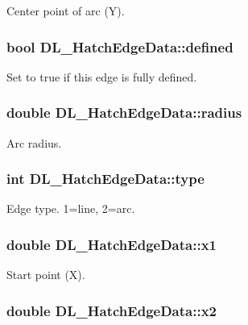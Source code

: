 Center point of arc (Y). \hypertarget{structDL__HatchEdgeData_aea9a928129f785b8f588e448622128a8}{
\subsubsection[{defined}]{\setlength{\rightskip}{0pt plus 5cm}bool D\-L\-\_\-\-Hatch\-Edge\-Data\-::defined}}\label{structDL__HatchEdgeData_aea9a928129f785b8f588e448622128a8}
Set to true if this edge is fully defined. \hypertarget{structDL__HatchEdgeData_acdec94f7b83716a78ccbecc68bea3370}{
\subsubsection[{radius}]{\setlength{\rightskip}{0pt plus 5cm}double D\-L\-\_\-\-Hatch\-Edge\-Data\-::radius}}\label{structDL__HatchEdgeData_acdec94f7b83716a78ccbecc68bea3370}
Arc radius. \hypertarget{structDL__HatchEdgeData_aa96eb140c30b436e50c7eca28c6684fb}{
\subsubsection[{type}]{\setlength{\rightskip}{0pt plus 5cm}int D\-L\-\_\-\-Hatch\-Edge\-Data\-::type}}\label{structDL__HatchEdgeData_aa96eb140c30b436e50c7eca28c6684fb}
Edge type. 1=line, 2=arc. \hypertarget{structDL__HatchEdgeData_a74a53d008d4d844c4301d3dbea329deb}{
\subsubsection[{x1}]{\setlength{\rightskip}{0pt plus 5cm}double D\-L\-\_\-\-Hatch\-Edge\-Data\-::x1}}\label{structDL__HatchEdgeData_a74a53d008d4d844c4301d3dbea329deb}
Start point (X). \hypertarget{structDL__HatchEdgeData_a07e6f723bbc500d5a278f56102a95710}{
\subsubsection[{x2}]{\setlength{\rightskip}{0pt plus 5cm}double D\-L\-\_\-\-Hatch\-Edge\-Data\-::x2}}\label{structDL__HatchEdgeData_a07e6f723bbc500d5a278f56102a95710}

